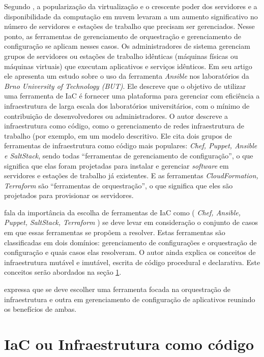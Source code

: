 Segundo , a popularização da virtualização e o crescente poder dos servidores e a disponibilidade da computação em nuvem levaram a um aumento significativo no número de servidores e estações de trabalho que precisam ser gerenciados. Nesse ponto, as ferramentas de gerenciamento de orquestração e gerenciamento de configuração se aplicam nesses casos. Os administradores de sistema gerenciam grupos de servidores ou estações de trabalho idênticas (máquinas físicas ou máquinas virtuais) que executam aplicativos e serviços idênticos. Em seu artigo ele apresenta um estudo sobre o uso da ferramenta \textit{Ansible} nos laboratórios da \textit{Brno University of Technology (BUT)}. Ele descreve que o objetivo de utilizar uma ferramenta de IaC é fornecer uma plataforma para gerenciar com eficiência a infraestrutura de larga escala dos laboratórios universitários, com o mínimo de contribuição de desenvolvedores ou administradores.
O autor descreve a infraestrutura como código, como o gerenciamento de redes infraestrutura de trabalho (por exemplo,  em um modelo descritivo. Ele cita dois grupos de ferramentas de infraestrutura como código mais populares: \textit{Chef, Puppet, Ansible e SaltStack}, sendo todas “ferramentas de gerenciamento de configuração”, o que significa que elas foram projetadas para instalar e gerenciar \textit{software} em servidores e estações de trabalho já existentes. E as ferramentas \textit{CloudFormation, Terraform} são “ferramentas de orquestração”, o que significa que eles são projetados para provisionar os servidores.

\hfill

  fala da importância da escolha de ferramentas de IaC como (\textit{ Chef, Ansible, Puppet, SaltStack, Terraform }) se deve levar em consideração o conjunto de casos em que essas ferramentas se propõem a resolver. Estas ferramentas são classificadas em dois domínios: gerenciamento de configurações e orquestração de configuração e quais casos elas resolveram. O autor ainda explica os conceitos de infraestrutura mutável e imutável, escrita de código procedural e declarativa. Este conceitos serão abordados na seção \ref{IaC}. 

 expressa que se deve escolher uma ferramenta focada na orquestração de infraestrutura e outra em gerenciamento de configuração de aplicativos reunindo os benefícios de ambas. 

\section{\esp IaC ou Infraestrutura como código} \label{IaC}

